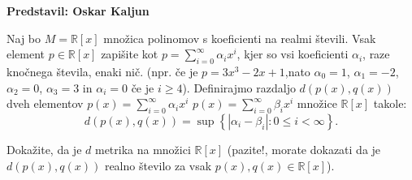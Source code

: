 \textbf{Predstavil: Oskar Kaljun}

Naj bo $M=\mathbb{R}[x]$ množica polinomov s koeficienti na realmi števili. Vsak element $p \in \mathbb{R}[x]$ zapišite kot $p = \sum_{i=0}^{\infty} \alpha_i x^{i}$, kjer so vsi koeficienti $\alpha_{i}$, raze knočnega števila, enaki nič. (npr. če je $p = 3x^{3} - 2x +1$,nato $\alpha_{0} = 1$, $\alpha_{1} =- 2$, $\alpha_{2} = 0$, $\alpha_{3} = 3$ in $\alpha_{i} = 0 $ če je $i \geq 4$). Definirajmo razdaljo $d \left( p(x), q(x) \right)$ dveh elementov $p(x) = \sum_{i=0}^{\infty} \alpha_{i} x^{i}$  $p(x) = \sum_{i=0}^{\infty} \beta_{i} x^{i}$ množice $\mathbb{R}[x]$ takole: \[d \left( p(x), q(x) \right) = \sup \left\{ \left| \alpha_{i} - \beta_{i} \right| : 0 \leq i < \infty \right\}.\]
		
Dokažite, da je $d$ metrika na množici $\mathbb{R}[x]$ (pazite!, morate dokazati da je $d \left( p(x), q(x) \right)$ realno število za vsak $p(x), q(x) \in \mathbb{R}[x]$).